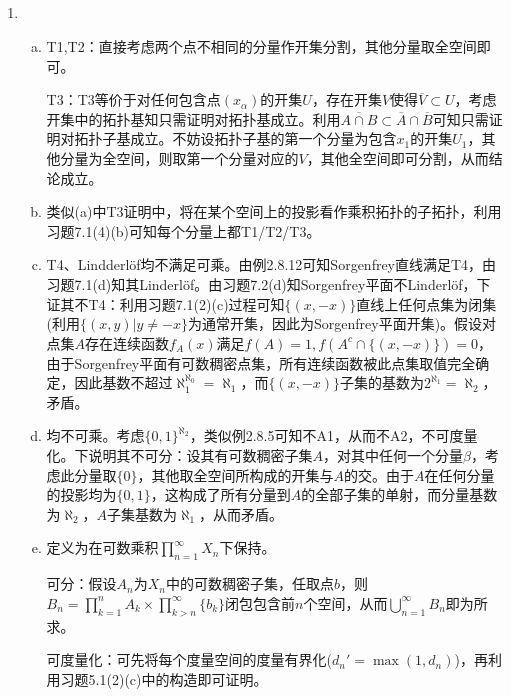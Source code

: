 \documentclass[a4paper,UTF8,fontset=windows]{ctexart}
\begin{document}
\subsection{}
\begin{enumerate}[(1)]
    \item
    \begin{enumerate}[(a)]
    \item
    T1,T2：直接考虑两个点不相同的分量作开集分割，其他分量取全空间即可。
    
    T3：T3等价于对任何包含点$(x_\alpha)$的开集$U$，存在开集$V$使得$\overline{V}\subset U$，考虑开集中的拓扑基知只需证明对拓扑基成立。利用$\overline{A\cap B}\subset\overline{A}\cap\overline{B}$可知只需证明对拓扑子基成立。不妨设拓扑子基的第一个分量为包含$x_1$的开集$U_1$，其他分量为全空间，则取第一个分量对应的$V$，其他全空间即可分割，从而结论成立。
    
    \item
    类似(a)中T3证明中，将在某个空间上的投影看作乘积拓扑的子拓扑，利用习题7.1(4)(b)可知每个分量上都T1/T2/T3。
    
    \item
    T4、Lindderl\"of均不满足可乘。由例2.8.12可知Sorgenfrey直线满足T4，由习题7.1(d)知其Linderl\"of。由习题7.2(d)知Sorgenfrey平面不Linderl\"of，下证其不T4：利用习题7.1(2)(c)过程可知$\{(x,-x)\}$直线上任何点集为闭集(利用$\{(x,y)|y\ne -x\}$为通常开集，因此为Sorgenfrey平面开集)。假设对点集$A$存在连续函数$f_A(x)$满足$f(A)=1,f(A^c\cap\{(x,-x)\})=0$，由于Sorgenfrey平面有可数稠密点集，所有连续函数被此点集取值完全确定，因此基数不超过$\aleph_1^{\aleph_0}=\aleph_1$，而$\{(x,-x)\}$子集的基数为$2^{\aleph_1}=\aleph_2$，矛盾。
    
    \item
    均不可乘。考虑$\{0,1\}^{\aleph_2}$，类似例2.8.5可知不A1，从而不A2，不可度量化。下说明其不可分：设其有可数稠密子集$A$，对其中任何一个分量$\beta$，考虑此分量取$\{0\}$，其他取全空间所构成的开集与$A$的交。由于$A$在任何分量的投影均为$\{0,1\}$，这构成了所有分量到$A$的全部子集的单射，而分量基数为$\aleph_2$，$A$子集基数为$\aleph_1$，从而矛盾。
    
    \item
    定义为在可数乘积$\prod_{n=1}^\infty X_n$下保持。
    
    可分：假设$A_n$为$X_n$中的可数稠密子集，任取点$b$，则$B_n=\prod_{k=1}^nA_k\times\prod_{k>n}^\infty\{b_k\}$闭包包含前$n$个空间，从而$\bigcup_{n=1}^\infty B_n$即为所求。
    
    可度量化：可先将每个度量空间的度量有界化($d_n'=\max(1,d_n)$)，再利用习题5.1(2)(c)中的构造即可证明。
    

\end{enumerate}
\end{enumerate}
\end{document}
